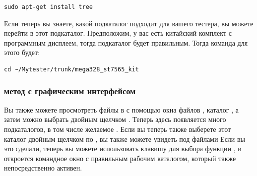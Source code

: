 \begin{large} \vspace{-0.4em} \begin{verbatim}
sudo apt-get install tree
\end{verbatim} \end{large}
Если теперь вы знаете, какой подкаталог подходит для вашего тестера,
вы можете перейти в этот подкаталог.
Предположим, у вас есть китайский комплект с программным дисплеем,
тогда подкаталог  будет правильным.
Тогда команда для этого будет:
\begin{large} \vspace{-0.4em} \begin{verbatim}
cd ~/Mytester/trunk/mega328_st7565_kit
\end{verbatim} \end{large}
\subsubsection{метод с графическим интерфейсом}
Вы также можете просмотреть файлы в  с помощью окна
файлов ,
каталог , а затем  можно выбрать двойным щелчком \LMB. 
Теперь здесь появляется много подкаталогов, в том числе
желаемое .
Если вы теперь также выберете этот каталог двойным щелчком по \LMB,
вы также можете увидеть  под файлами
Если вы это сделали, теперь вы можете использовать клавишу \RMB для выбора
функции , и откроется командное окно с правильным рабочим каталогом,
который также непосредственно активен.
